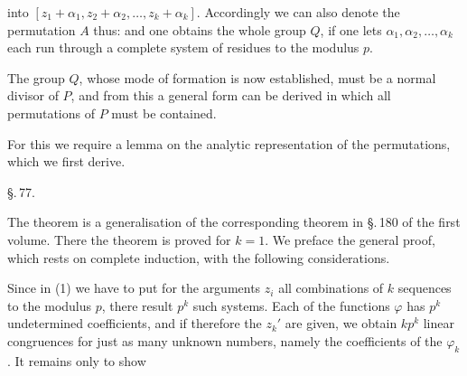 into $[z_1+\alpha_1, z_2+\alpha_2, \ldots, z_k+\alpha_k]$. Accordingly we can also denote the permutation $A$ thus:
and one obtains the whole group $Q$, if one lets $\alpha_1, \alpha_2, \ldots, \alpha_k$ each run through a complete system of residues to the modulus $p$.

The group $Q$, whose mode of formation is now established, must be a normal divisor of $P$, and from this a general form can be derived in which all permutations of $P$ must be contained.

For this we require a lemma on the analytic representation of the permutations, which we first derive.

\begin{center}
\S.\,77.\\
\end{center}


The theorem is a generalisation of the corresponding theorem in \S.\,180 of the first volume. There the theorem is proved for $k = 1$. We preface the general proof, which rests on complete induction, with the following considerations.

Since in (1) we have to put for the arguments $z_i$ all combinations of $k$ sequences to the modulus $p$, there result $p^k$ such systems. Each of the functions $\varphi$ has $p^k$ undetermined coefficients, and if therefore the $z_k'$ are given, we obtain $kp^k$ linear congruences for just as many unknown numbers, namely the coefficients of the $\varphi_k$. It remains only to show
